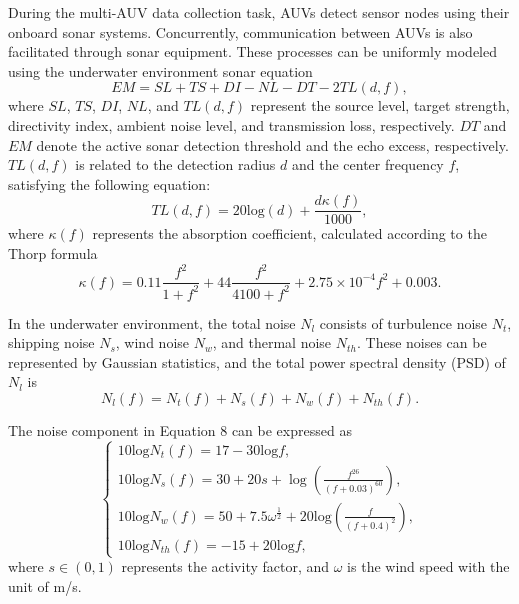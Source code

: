 \documentclass{article}
\begin{document}
During the multi-AUV data collection task, AUVs detect sensor nodes using their onboard sonar systems. Concurrently, communication between AUVs is also facilitated through sonar equipment. These processes can be uniformly modeled using the underwater environment sonar equation
\begin{equation}\label{eq:6}
EM=SL+TS+DI-NL-DT-2TL(d,f),
\end{equation}
where $SL$, $TS$, $DI$, $NL$, and $TL(d,f)$ represent the source level, target strength, directivity index, ambient noise level, and transmission loss, respectively. $DT$ and $EM$ denote the active sonar detection threshold and the echo excess, respectively. $TL(d,f)$ is related to the detection radius $d$ and the center frequency $f$, satisfying the following equation:
\begin{equation}\label{eq:7}
TL(d,f)=20\mathrm{log}(d)+\frac{d\kappa(f)}{1000},
\end{equation}
where $\kappa(f)$ represents the absorption coefficient, calculated according to the Thorp formula
\begin{equation}\label{eq:8}
\kappa(f)= 0.11\frac{f^{2}}{1+ f^{2}}+ 44 \frac{f^{2}}{4100+ f^{2}}+ 2.75\times10^{-4} f^{2}+0.003.
\end{equation}

In the underwater environment, the total noise $N_l$ consists of turbulence noise $N_t$, shipping noise $N_s$, wind noise $N_w$, and thermal noise $N_{th}$. These noises can be represented by Gaussian statistics, and the total power spectral density (PSD) of $N_l$ is
\begin{equation}\label{eq:9}
N_l(f)=N_t(f)+N_s(f)+N_w(f)+N_{th}(f).
\end{equation}

The noise component in Equation 8 can be expressed as
\begin{equation}\label{eq:10}
\begin{cases}
10\mathrm{log}N_t(f)=17-30\mathrm{log}f,\\10\mathrm{log}N_s(f)=30+20s+\log\left(\frac{f^{26}}{(f+0.03)^{60}}\right),\\10\mathrm{log}N_w(f)=50+7.5\omega^{\frac{1}{2}}+20\mathrm{log}\left(\frac{f}{(f+0.4)^{2}}\right),\\10\mathrm{log}N_{th}(f)=- 15+20\mathrm{log}f,
\end{cases}
\end{equation}
where $s\in(0,1)$ represents the activity factor, and $\omega$ is the wind speed with the unit of m/s.
\end{document}
